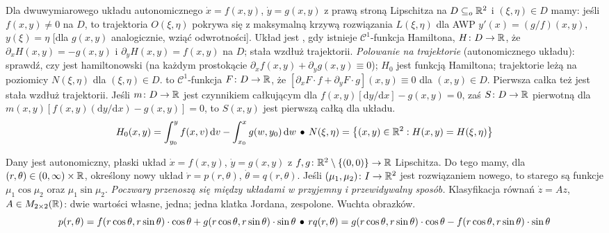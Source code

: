 Dla  dwuwymiarowego układu autonomicznego $\dot x = f(x,y)$, $\dot y = g(x,y)$ z prawą stroną Lipschitza na $D \subseteq_o \mathbb{R}^2$ i $(\xi, \eta) \in D$ mamy:
jeśli $f(x,y) \neq 0$ na $D$, to trajektoria $O(\xi, \eta)$ pokrywa się z maksymalną krzywą rozwiązania $L(\xi, \eta)$ dla AWP $y'(x) = (g/f)(x,y)$, $y(\xi) = \eta$ [dla $g(x,y)$ analogicznie, wziąć odwrotności].
Układ jest , gdy istnieje $\mathscr C^1$-funkcja Hamiltona, $H \colon D \to \mathbb{R}$, że $\partial_x H(x,y) = -g(x,y)$ i $\partial_y H(x,y) = f(x,y)$ na $D$; stała wzdłuż trajektorii.
\emph{Polowanie na trajektorie} (autonomicznego układu):
sprawdź, czy jest hamiltonowski (na każdym prostokącie $\partial_xf(x,y) + \partial_yg(x,y) \equiv 0$); $H_0$ jest funkcją Hamiltona; trajektorie leżą na poziomicy $N(\xi, \eta)$ dla $(\xi, \eta) \in D$.
 to $\mathscr C^1$-funkcja $F \colon D \to \mathbb{R}$, że $[\partial_xF \cdot f + \partial_yF \cdot g](x,y) \equiv 0$ dla $(x,y) \in D$.
Pierwsza całka też jest stała wzdłuż trajektorii.
Jeśli $m \colon D \to \mathbb{R}$ jest czynnikiem całkującym dla $f(x,y) [\textrm{d}y/\textrm{d}x] - g(x,y) = 0$, zaś $S \colon D \to \mathbb{R}$ pierwotną dla $m(x,y) [f(x,y)  (\textrm{d}y/\textrm{d}x) - g(x,y)] = 0$, to $S(x,y)$ jest pierwszą całką dla układu.
\[
	H_0(x,y) = \int_{y_0}^y f(x,v) \,\textrm{d}v - \int_{x_0}^x g(w,y_0) \,\textrm{d}w \, \bullet \,
	N(\xi, \eta) = \left\{(x,y) \in \mathbb{R}^2 : H(x,y) = H(\xi, \eta)\right\}
\]

Dany jest  autonomiczny, płaski układ $\dot x= f(x,y)$, $\dot y = g(x,y)$ z $f, g \colon \mathbb{R}^2 \setminus\{(0,0)\} \to\mathbb{R}$ Lipschitza.
Do tego mamy, dla $(r, \theta) \in (0,\infty) \times \mathbb{R}$, określony nowy układ $\dot r = p(r, \theta)$, $\dot \theta = q(r, \theta)$.
Jeśli $(\mu_1, \mu_2) \colon I \to \mathbb{R}^2$ jest rozwiązaniem nowego, to starego są funkcje $\mu_1 \cos \mu_2$ oraz $\mu_1 \sin \mu_2$.
\emph{Poczwary przenoszą się między układami w przyjemny i przewidywalny sposób.}
Klasyfikacja  równań $\dot z = Az$, $A \in M_{2 \times 2} (\mathbb{R})$: dwie wartości własne, jedna; jedna klatka Jordana, zespolone. Wuchta obrazków.
\[
	p(r, \theta) = f(r \cos \theta, r \sin \theta) \cdot \cos \theta + g(r \cos \theta, r \sin \theta) \cdot \sin \theta \, \bullet \,
	r q(r,\theta) = g(r \cos \theta, r \sin \theta) \cdot \cos \theta - f(r \cos \theta, r \sin \theta) \cdot \sin \theta
\]